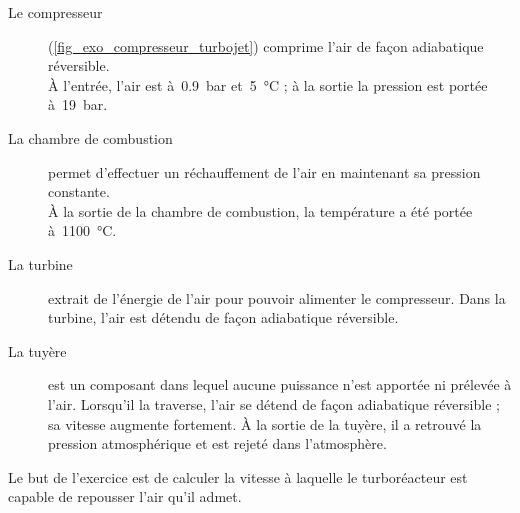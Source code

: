 	\begin{description}
		\item [Le compresseur] (\cref{fig_exo_compresseur_turbojet}) comprime l’air de façon adiabatique réversible.\\
			À l’entrée, l’air est à~\SI{0,9}{\bar} et~\SI{5}{\degreeCelsius} ; à la sortie la pression est portée à~\SI{19}{\bar}.
		\item [La chambre de combustion] permet d’effectuer un réchauffement de l’air en maintenant sa pression constante.\\
			À la sortie de la chambre de combustion, la température a été portée à~\SI{1100}{\degreeCelsius}.
		\item [La turbine] extrait de l’énergie de l’air pour pouvoir alimenter le compresseur. Dans la turbine, l’air est détendu de façon adiabatique réversible.
		\item [La tuyère] est un composant dans lequel aucune puissance n’est apportée ni prélevée à l’air. Lorsqu’il la traverse, l’air se détend de façon adiabatique réversible ; sa vitesse augmente fortement. À la sortie de la tuyère, il a retrouvé la pression atmosphérique et est rejeté dans l’atmosphère.
	\end{description}
	
	Le but de l’exercice est de calculer la vitesse à laquelle le turboréacteur est capable de repousser l’air qu’il admet.
	
	\pagebreak[1] %
	
